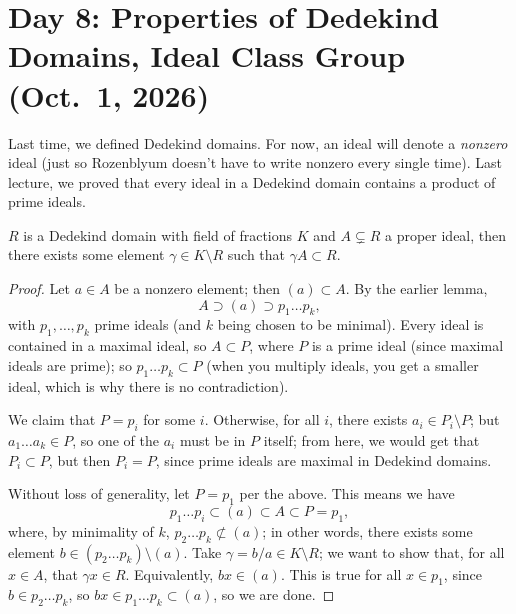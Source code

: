 \section{Day 8: Properties of Dedekind Domains, Ideal Class Group (Oct.\ 1, 2026)}
Last time, we defined Dedekind domains. For now, an ideal will denote a \textit{nonzero} ideal (just so Rozenblyum doesn't have to write nonzero every single time). Last lecture, we proved that every ideal in a Dedekind domain contains a product of prime ideals.

\begin{lemma} \label{lem:field_of_fractions_and_ideal_of_dedekind_domain} %
    $R$ is a Dedekind domain with field of fractions $K$ and $A \subsetneq R$ a proper ideal, then there exists some element $\gamma \in K \setminus R$ such that $\gamma A \subset R$.
\end{lemma}
\begin{proof}
    Let $a \in A$ be a nonzero element; then $(a) \subset A$. By the earlier lemma,
    \[ A \supset (a) \supset p_1 \dots p_k, \]
    with $p_1, \dots, p_k$ prime ideals (and $k$ being chosen to be minimal). Every ideal is contained in a maximal ideal, so $A \subset P$, where $P$ is a prime ideal (since maximal ideals are prime); so $p_1 \dots p_k \subset P$ (when you multiply ideals, you get a smaller ideal, which is why there is no contradiction).

    We claim that $P = p_i$ for some $i$. Otherwise, for all $i$, there exists $a_i \in P_i \setminus P$; but $a_1 \dots a_k \in P$, so one of the $a_i$ must be in $P$ itself; from here, we would get that $P_i \subset P$, but then $P_i = P$, since prime ideals are maximal in Dedekind domains.

    Without loss of generality, let $P = p_1$ per the above. This means we have
    \[ p_1 \dots p_i \subset (a) \subset A \subset P = p_1, \]
    where, by minimality of $k$, $p_2 \dots p_k \not\subset (a)$; in other words, there exists some element $b \in (p_2 \dots p_k) \setminus (a)$. Take $\gamma = b/a \in K \setminus R$; we want to show that, for all $x \in A$, that $\gamma x \in R$. Equivalently, $b x \in (a)$. This is true for all $x \in p_1$, since $b \in p_2 \dots p_k$, so $b x \in p_1 \dots p_k \subset (a)$, so we are done.
\end{proof}

